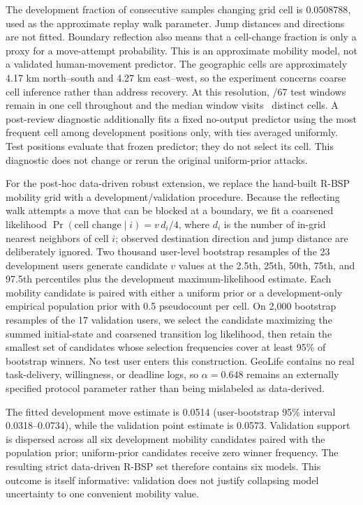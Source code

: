 \documentclass[review,12pt]{elsarticle}
\begin{document}
The development fraction of consecutive samples changing grid cell is $0.0508788$, used as the approximate replay walk parameter. Jump distances and directions are not fitted. Boundary reflection also means that a cell-change fraction is only a proxy for a move-attempt probability. This is an approximate mobility model, not a validated human-movement predictor. The geographic cells are approximately 4.17 km north--south and 4.27 km east--west, so the experiment concerns coarse cell inference rather than address recovery. At this resolution, \ReplayStaticWindows/67 test windows remain in one cell throughout and the median window visits \ReplayMedianCells\ distinct cells. A post-review diagnostic additionally fits a fixed no-output predictor using the most frequent cell among development positions only, with ties averaged uniformly. Test positions evaluate that frozen predictor; they do not select its cell. This diagnostic does not change or rerun the original uniform-prior attacks.

For the post-hoc data-driven robust extension, we replace the hand-built R-BSP mobility grid with a development/validation procedure. Because the reflecting walk attempts a move that can be blocked at a boundary, we fit a coarsened likelihood $\Pr(\text{cell change}\mid i)=v\,d_i/4$, where $d_i$ is the number of in-grid nearest neighbors of cell $i$; observed destination direction and jump distance are deliberately ignored. Two thousand user-level bootstrap resamples of the 23 development users generate candidate $v$ values at the 2.5th, 25th, 50th, 75th, and 97.5th percentiles plus the development maximum-likelihood estimate. Each mobility candidate is paired with either a uniform prior or a development-only empirical population prior with 0.5 pseudocount per cell. On 2,000 bootstrap resamples of the 17 validation users, we select the candidate maximizing the summed initial-state and coarsened transition log likelihood, then retain the smallest set of candidates whose selection frequencies cover at least 95\% of bootstrap winners. No test user enters this construction. GeoLife contains no real task-delivery, willingness, or deadline logs, so $\alpha=0.648$ remains an externally specified protocol parameter rather than being mislabeled as data-derived.

The fitted development move estimate is 0.0514 (user-bootstrap 95\% interval 0.0318--0.0734), while the validation point estimate is 0.0573. Validation support is dispersed across all six development mobility candidates paired with the population prior; uniform-prior candidates receive zero winner frequency. The resulting strict data-driven R-BSP set therefore contains six models. This outcome is itself informative: validation does not justify collapsing model uncertainty to one convenient mobility value.
\end{document}
